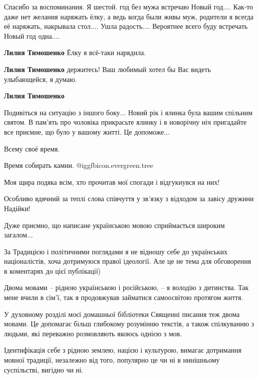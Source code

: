 \begin{itemize}

Спасибо за воспоминания. Я шестой. год без мужа встречаю Новый год.... Как-то
даже нет желания наряжать ёлку, а ведь когда были живы муж, родители я всегда
её наряжать, накрывала стол.... Ушла радость.... Вероятнее всего буду встречать
Новый год одна....

\begin{itemize} %
\textbf{Лилия Тимошенко} Ёлку я всё-таки нарядила.

\textbf{Лилия Тимошенко} держитесь! Ваш любимый хотел бы Вас видеть улыбающейся, я думаю.

\textbf{Лилия Тимошенко} 

Подивіться на ситуацію з іншого боку... Новий рік і ялинка була вашим спільним
святом. В пам'ять про чоловіка прикрасьте ялинку і в новорічну ніч пригадайте
все приємне, що було у вашому житті. Це допоможе...

\end{itemize} %

Всему своё время.

Время собирать камни.  @igg{fbicon.evergreen.tree} 


Моя щира подяка всім, хто прочитав мої спогади і відгукнувся на них!

Особливо вдячний за теплі слова співчуття у зв’язку з відходом за завісу
дружини Надійки!

Дуже приємно, що написане українською мовою сприймається широким загалом...

За Традицією і політичними поглядами я не відношу себе до українських
націоналістів, хоча дотримуюся правої ідеології. Але це не тема для обговорення
в коментарях до цієї публікації)

Двома мовами – рідною українською і російською, – я володію з дитинства. Так
мене вчили в сім’ї, так я продовжував займатися самоосвітою протягом життя.

У духовному розділі моєї домашньої бібліотеки Священні писання теж двома
мовами. Це допомагає більш глибокому розумінню текстів, а також спілкуванню з
людьми, які переважно розмовляють якоюсь однією з мов.

Ідентифікація себе з рідною землею, нацією і культурою, вимагає дотримання
мовної традиції, незалежно від того, популярно це чи ні в нинішньому
суспільстві, вигідно чи ні.


\end{itemize}
